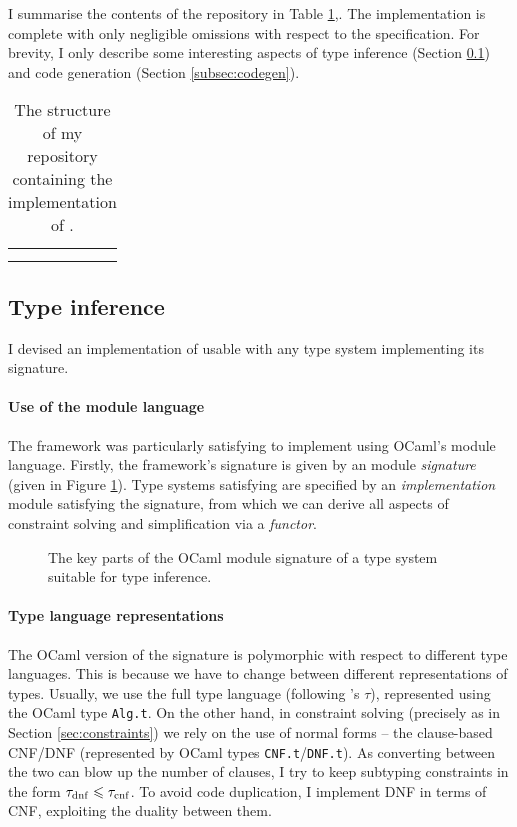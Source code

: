 I summarise the contents of the repository in Table \ref{tab:repository},\todo[color=red]{}. The implementation is complete with only negligible omissions with respect to the specification. For brevity, I only describe some interesting aspects of type inference (Section \ref{subsec:type-inference-impl}) and code generation (Section \ref{subsec:codegen}).

\begin{table}[p]
    \centering
    \begin{tabular}{c|c}
         &  \\
         & 
    \end{tabular}
    \caption{The structure of my repository containing the implementation of \compiler{}.}
    \label{tab:repository}
\end{table}

\subsection{Type inference} 
\label{subsec:type-inference-impl}

I devised an implementation of \inference{} usable with any type system implementing its signature. 

\paragraph{Use of the module language} The framework was particularly satisfying to implement using OCaml's module language. Firstly, the framework's signature is given by an module \emph{signature} (given in Figure \ref{fig:inference-signature}). Type systems satisfying are specified by an \emph{implementation} module satisfying the signature, from which we can derive all aspects of constraint solving and simplification via a \emph{functor}.

\begin{figure}[p]
    \centering
    
    \caption{The key parts of the OCaml module signature of a type system suitable for type inference.}
    \label{fig:inference-signature}
\end{figure}

\paragraph{Type language representations} The OCaml version of the signature is polymorphic with respect to different type languages. This is because we have to change between different representations of types. 
Usually, we use the full type language (following \inference{}'s $\tau$), represented using the OCaml type \texttt{Alg.t}. On the other hand, in constraint solving (precisely as in Section \ref{sec:constraints}) we rely on the use of normal forms -- the clause-based CNF/DNF (represented by OCaml types \texttt{CNF.t}/\texttt{DNF.t}). As converting between the two can blow up the number of clauses, I try to keep subtyping constraints in the form $\tau_\mathrm{dnf} \leqslant \tau_\mathrm{cnf}$. To avoid code duplication, I implement DNF in terms of CNF, exploiting the duality between them. 

